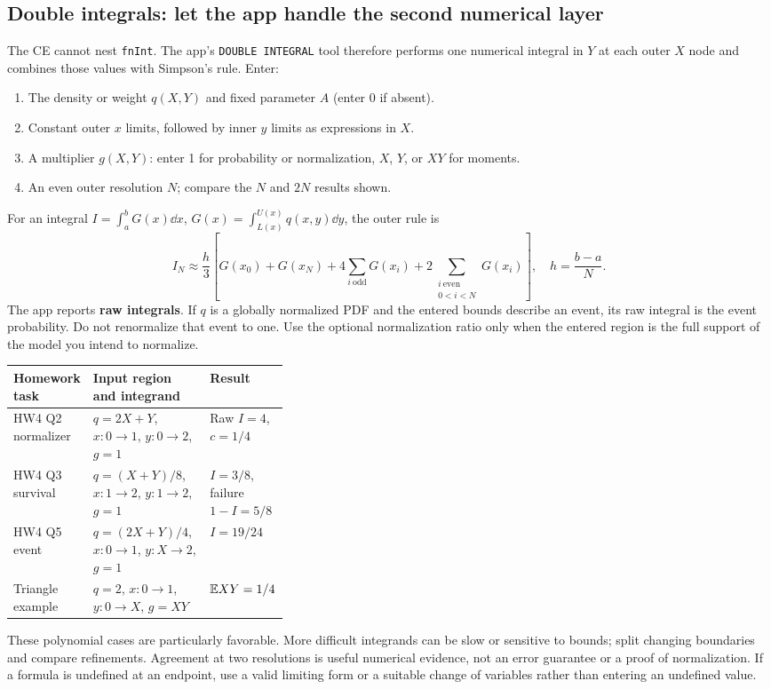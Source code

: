 \subsection{Double integrals: let the app handle the second numerical layer}
The CE cannot nest \texttt{fnInt}. The app's \texttt{DOUBLE INTEGRAL} tool therefore performs one numerical integral in $Y$ at each outer $X$ node and combines those values with Simpson's rule. Enter:
\begin{enumerate}
\item The density or weight $q(X,Y)$ and fixed parameter $A$ (enter 0 if absent).
\item Constant outer $x$ limits, followed by inner $y$ limits as expressions in $X$.
\item A multiplier $g(X,Y)$: enter 1 for probability or normalization, $X$, $Y$, or $XY$ for moments.
\item An even outer resolution $N$; compare the $N$ and $2N$ results shown.
\end{enumerate}
For an integral $I=\int_a^bG(x)\dd x$, $G(x)=\int_{L(x)}^{U(x)}q(x,y)\dd y$, the outer rule is
\[
I_N\approx\frac h3\left[G(x_0)+G(x_N)+4\sum_{i\ \mathrm{odd}}G(x_i)+2\sum_{\substack{i\ \mathrm{even}\\0<i<N}}G(x_i)\right],
\quad h=\frac{b-a}{N}.
\]
The app reports \textbf{raw integrals}. If $q$ is a globally normalized PDF and the entered bounds describe an event, its raw integral is the event probability. Do not renormalize that event to one. Use the optional normalization ratio only when the entered region is the full support of the model you intend to normalize.

\begin{tabularx}{\linewidth}{@{}p{0.20\linewidth}Xp{0.16\linewidth}@{}}
\toprule Homework task & Input region and integrand & Result\\\midrule
HW4 Q2 normalizer & $q=2X+Y$, $x:0\to1$, $y:0\to2$, $g=1$ & Raw $I=4$, $c=1/4$\\
HW4 Q3 survival & $q=(X+Y)/8$, $x:1\to2$, $y:1\to2$, $g=1$ & $I=3/8$, failure $1-I=5/8$\\
HW4 Q5 event & $q=(2X+Y)/4$, $x:0\to1$, $y:X\to2$, $g=1$ & $I=19/24$\\
Triangle example & $q=2$, $x:0\to1$, $y:0\to X$, $g=XY$ & $\mathbb E XY=1/4$\\\bottomrule
\end{tabularx}

These polynomial cases are particularly favorable. More difficult integrands can be slow or sensitive to bounds; split changing boundaries and compare refinements. Agreement at two resolutions is useful numerical evidence, not an error guarantee or a proof of normalization. If a formula is undefined at an endpoint, use a valid limiting form or a suitable change of variables rather than entering an undefined value.

